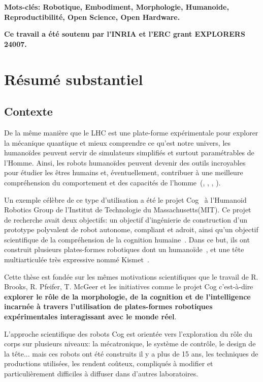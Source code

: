 \textbf{Mots-clés: Robotique, Embodiment, Morphologie, Humanoide, Reproductibilité, Open Science, Open Hardware.} 

\textbf{Ce travail a été soutenu par l'INRIA et l'ERC grant EXPLORERS 24007.}



\cleartoleftpage 
\cleardoublepage

\chapter*{Résumé substantiel}

\section*{Contexte} %

De la même manière que le LHC est une plate-forme expérimentale pour explorer la mécanique quantique et mieux comprendre ce qu’est notre univers, les humanoïdes peuvent servir de simulateurs simplifiés et surtout paramétrables de l'Homme. Ainsi, les robots humanoïdes peuvent devenir des outils incroyables pour étudier les êtres humains et, éventuellement, contribuer à une meilleure compréhension du comportement et des capacités de l’homme~(\cite{atkeson2000using}, \cite{cheng2007cb}, \cite{brooks1986achieving}, \cite{oudeyer2010impact}).

Un exemple célèbre de ce type  d’utilisation a été le projet Cog~\parencite{brooks1999cog} à l'Humanoid Robotics Group de l'Institut de Technologie du Massachusetts(MIT). Ce projet de recherche avait deux objectifs: un objectif d'ingénierie de construction d'un prototype polyvalent de robot autonome, compliant et adroit, ainsi qu’un objectif scientifique de la compréhension de la cognition humaine~\parencite{brooks1994building}. Dans ce but, ils ont construit plusieurs plates-formes robotiques dont un humanoïde~\parencite{brooks1999cog}, et une tête multiarticulée très expressive nommé Kismet~\parencite{breazeal2003emotion}.

Cette thèse est fondée sur les mêmes motivations scientifiques que le travail de R. Brooks, R. Pfeifer, T. McGeer et les initiatives comme le projet Cog c’est-à-dire \textbf{explorer le rôle de la morphologie, de la cognition et de l'intelligence incarnée à travers l'utilisation de plates-formes robotiques expérimentales interagissant avec le monde réel}.

L'approche scientifique des robots Cog est orientée vers l'exploration du rôle du corps sur plusieurs niveaux: la mécatronique, le système de contrôle, le design de la tête...  mais ces robots ont été construits il y a plus de 15 ans, les techniques de productions utilisées, les rendent coûteux, compliqués à modifier et particulièrement difficiles à diffuser dans d'autres laboratoires.

